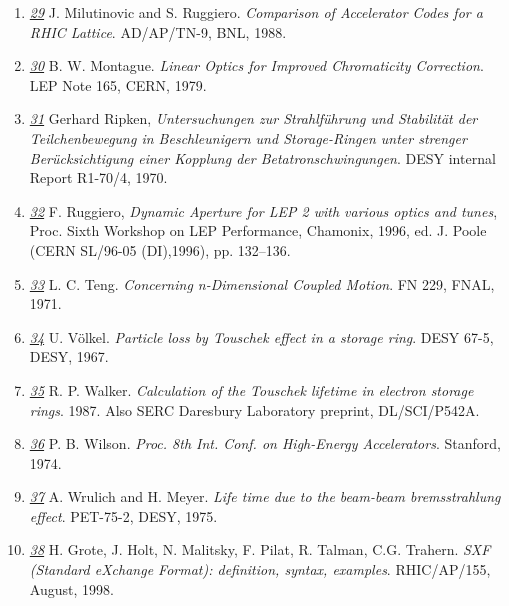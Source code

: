 \begin{enumerate}
	\item \href{ruggiero}{\textit{29}} J. Milutinovic and
          S. Ruggiero. \textit{Comparison of Accelerator Codes for a
            RHIC Lattice}. AD/AP/TN-9, BNL, 1988. 

	\item \href{montague}{\textit{30}}
          B. W. Montague. \textit{Linear Optics for Improved
            Chromaticity Correction}. LEP Note 165, CERN, 1979. 

	\item \href{ripken}{\textit{31}} Gerhard Ripken,
          \textit{Untersuchungen zur Strahlf\"uhrung und Stabilit\"at
            der Teilchenbewegung in Beschleunigern und Storage-Ringen
            unter strenger Ber\"ucksichtigung einer Kopplung der
            Betatronschwingungen}. DESY internal Report R1-70/4, 1970. 

	\item \href{chamonix96}{\textit{32}} F. Ruggiero,
          \textit{Dynamic Aperture for LEP 2 with various optics and
            tunes}, Proc. Sixth Workshop on LEP Performance, Chamonix,
          1996, ed. J. Poole (CERN SL/96-05 (DI),1996), pp. 132--136. 

	\item \href{teng}{\textit{33}} L. C. Teng. \textit{Concerning
          n-Dimensional Coupled Motion}. FN 229, FNAL, 1971. 

	\item \href{voelkel}{\textit{34}} U. V\"olkel. \textit{Particle
          loss by Touschek effect in a storage ring}. DESY 67-5, DESY,
          1967. 

	\item \href{walker}{\textit{35}}
          R. P. Walker. \textit{Calculation of the Touschek lifetime in
            electron storage rings}. 1987. Also SERC Daresbury
          Laboratory preprint, DL/SCI/P542A. 

	\item \href{wilson}{\textit{36}} P. B. Wilson. \textit{Proc. 8th
          Int. Conf. on High-Energy Accelerators}. Stanford, 1974. 

	\item \href{wrulich}{\textit{37}} A. Wrulich and
          H. Meyer. \textit{Life time due to the beam-beam
            bremsstrahlung effect}. PET-75-2, DESY, 1975. 

	\item \href{SXF}{\textit{38}}  H. Grote, J. Holt, N. Malitsky,
          F. Pilat, R. Talman, C.G. Trahern. \textit{SXF (Standard
            eXchange Format): definition, syntax,
            examples}. RHIC/AP/155, August, 1998.  


\end{enumerate}
